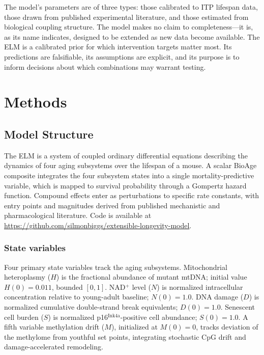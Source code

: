 \documentclass[11pt]{article}
\begin{document}
The model's parameters are of three types: those calibrated to ITP lifespan data, those drawn from published experimental literature, and those estimated from biological coupling structure. The model makes no claim to completeness---it is, as its name indicates, designed to be extended as new data become available. The ELM is a calibrated prior for which intervention targets matter most. Its predictions are falsifiable, its assumptions are explicit, and its purpose is to inform decisions about which combinations may warrant testing.

\section{Methods}

\subsection{Model Structure}

The ELM is a system of coupled ordinary differential equations describing the dynamics of four aging subsystems over the lifespan of a mouse. A scalar BioAge composite integrates the four subsystem states into a single mortality-predictive variable, which is mapped to survival probability through a Gompertz hazard function. Compound effects enter as perturbations to specific rate constants, with entry points and magnitudes derived from published mechanistic and pharmacological literature. Code is available at \url{https://github.com/silmonbiggs/extensible-longevity-model}.

\subsubsection{State variables}

Four primary state variables track the aging subsystems. Mitochondrial heteroplasmy ($H$) is the fractional abundance of mutant mtDNA; initial value $H(0) = 0.011$, bounded $[0, 1]$. NAD$^+$ level ($N$) is normalized intracellular concentration relative to young-adult baseline; $N(0) = 1.0$. DNA damage ($D$) is normalized cumulative double-strand break equivalents; $D(0) = 1.0$. Senescent cell burden ($S$) is normalized p16$^{\text{Ink4a}}$-positive cell abundance; $S(0) = 1.0$. A fifth variable methylation drift ($M$), initialized at $M(0) = 0$, tracks deviation of the methylome from youthful set points, integrating stochastic CpG drift and damage-accelerated remodeling.
\end{document}
